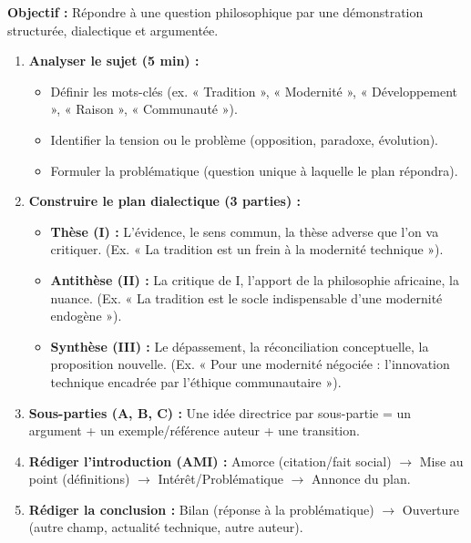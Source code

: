 \documentclass[11pt]{article}
\newcommand{\cle}[1]{{\popxbold\color{popdark}#1}}
\begin{document}
\begin{methode}
\textbf{Objectif :} Répondre à une question philosophique par une démonstration structurée, dialectique et argumentée.
\begin{enumerate}
    \item \textbf{Analyser le sujet (5 min) :}
        \begin{itemize}
            \item Définir les \cle{mots-clés} (ex. « Tradition », « Modernité », « Développement », « Raison », « Communauté »).
            \item Identifier la \cle{tension} ou le \cle{problème} (opposition, paradoxe, évolution).
            \item Formuler la \cle{problématique} (question unique à laquelle le plan répondra).
        \end{itemize}
    \item \textbf{Construire le plan dialectique (3 parties) :}
        \begin{itemize}
            \item \textbf{Thèse (I) :} L'évidence, le sens commun, la thèse adverse que l'on va critiquer. (Ex. « La tradition est un frein à la modernité technique »).
            \item \textbf{Antithèse (II) :} La critique de I, l'apport de la philosophie africaine, la nuance. (Ex. « La tradition est le socle indispensable d'une modernité endogène »).
            \item \textbf{Synthèse (III) :} Le dépassement, la réconciliation conceptuelle, la proposition nouvelle. (Ex. « Pour une \cle{modernité négociée} : l'innovation technique encadrée par l'éthique communautaire »).
        \end{itemize}
    \item \textbf{Sous-parties (A, B, C) :} Une idée directrice par sous-partie = un argument + un exemple/référence auteur + une transition.
    \item \textbf{Rédiger l'introduction (AMI) :} \cle{Amorce} (citation/fait social) $\rightarrow$ \cle{Mise au point} (définitions) $\rightarrow$ \cle{Intérêt/Problématique} $\rightarrow$ \cle{Annonce du plan}.
    \item \textbf{Rédiger la conclusion :} \cle{Bilan} (réponse à la problématique) $\rightarrow$ \cle{Ouverture} (autre champ, actualité technique, autre auteur).
\end{enumerate}
\end{methode}
\end{document}
